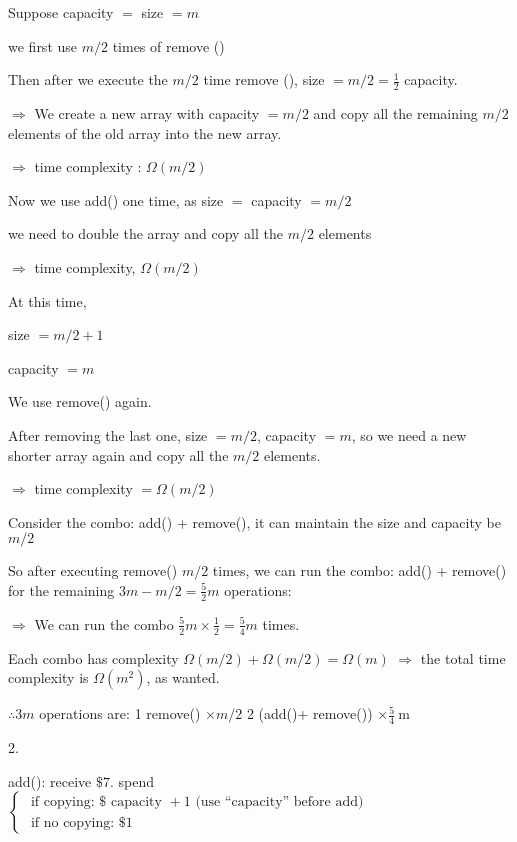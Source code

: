 \documentclass[12pt]{article}
\begin{document}
Suppose capacity $=$ size $=m$

we first use $m / 2$ times of remove ()

Then after we execute the $m / 2$ time remove (), size $=m / 2=\frac{1}{2}$ capacity.

$\Rightarrow$ We create a new array with capacity $=m / 2$ and copy all the remaining $m / 2$ elements of the old array into the new array.

$\Rightarrow$ time complexity : $\Omega(m / 2)$

Now we use add() one time, as size $=$ capacity $=m / 2$ 

we need to double the array and copy all the $m / 2$ elements

$\Rightarrow$ time complexity, $\Omega(m / 2)$

At this time, 

size $=m / 2+1 \quad$

capacity $=m$

We use remove() again.

After removing the last one, size $=m / 2$, capacity $=m$, so we need a new shorter array again and copy all the $m / 2$ elements.

$\Rightarrow$ time complexity $=\Omega(m / 2)$

Consider the combo: add() + remove(), it can maintain the size and capacity be $m / 2$

So after executing remove() $m / 2$ times, we can run the combo: add() + remove() for the remaining $3 m-m / 2=\frac{5}{2} m$ operations:

$\Rightarrow$ We can run the combo $\frac{5}{2} m \times \frac{1}{2}=\frac{5}{4} m$ times.

Each combo has complexity $\Omega(m / 2)+\Omega(m / 2)=\Omega(m)$ $\Rightarrow$ the total time complexity is $\Omega\left(m^2\right)$, as wanted.

$\therefore 3 m$ operations are: {\small\textcircled{\scriptsize{1}}} remove() $\times m / 2 $ 
 {\small\textcircled{\scriptsize{2}}} (add()+ remove()) $\times \frac{5}{4} \mathrm{~m}$

\newpage

2.

add(): receive $\$ 7$. spend $\left\{\begin{array}{l}\text { if copying: } \$ \text { capacity }+1 \text { (use ``capacity'' before add) } \\ \text { if no copying: } \$ 1\end{array}\right.$ 
\end{document}
